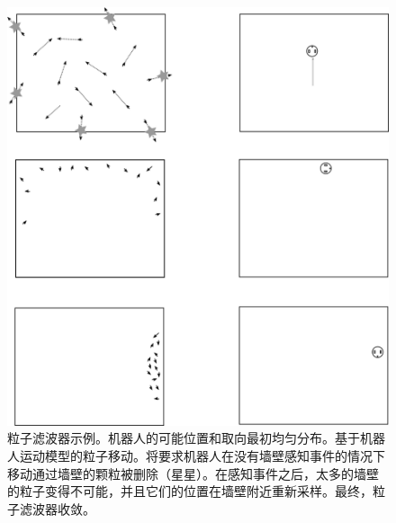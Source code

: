 \begin{figure}
	\centering
		\includegraphics[width=\textwidth]{figs/particlefilter_example}
	\caption{粒子滤波器示例。机器人的可能位置和取向最初均匀分布。基于机器人运动模型的粒子移动。将要求机器人在没有墙壁感知事件的情况下移动通过墙壁的颗粒被删除（星星）。在感知事件之后，太多的墙壁的粒子变得不可能，并且它们的位置在墙壁附近重新采样。最终，粒子滤波器收敛。}
	\label{fig:particlefilter_example}
\end{figure}


